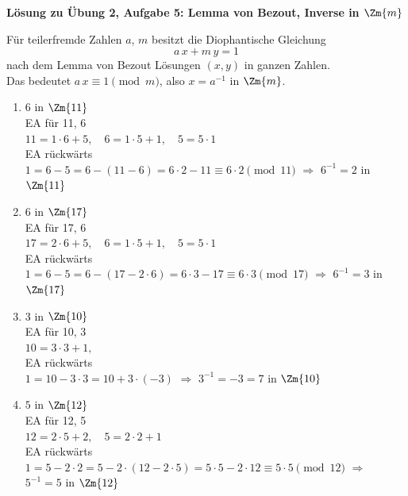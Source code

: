 \textbf{Lösung zu Übung 2, Aufgabe 5: Lemma von Bezout, Inverse in $\Zm{m}$}

\begin{loesung}
Für teilerfremde Zahlen $a$, $m$ besitzt die Diophantische Gleichung
\[
a\,x + m\,y = 1
\]
nach dem Lemma von Bezout Lösungen $(x, y)$ in ganzen Zahlen.\\
Das bedeutet \quad $a\,x \equiv 1 \pmod{m}$, also $x = a^{-1}$ in $\Zm{m}$.

\begin{enumerate}[label=\alph*)]
\item $6$ in $\Zm{11}$\\
EA für 11, 6\\
$11 = 1\cdot 6 + 5,\quad 6 = 1\cdot 5 + 1,\quad 5 = 5\cdot 1$\\
EA rückwärts\\
$1 = 6 - 5 = 6 - (11 - 6) = 6\cdot 2 - 11 \equiv 6\cdot 2 \pmod{11}$ \quad $\Rightarrow$ \quad $6^{-1} = 2$ in $\Zm{11}$

\item $6$ in $\Zm{17}$\\
EA für 17, 6\\
$17 = 2\cdot 6 + 5,\quad 6 = 1\cdot 5 + 1,\quad 5 = 5\cdot 1$\\
EA rückwärts\\
$1 = 6 - 5 = 6 - (17 - 2\cdot 6) = 6\cdot 3 - 17 \equiv 6\cdot 3 \pmod{17}$ \quad $\Rightarrow$ \quad $6^{-1} = 3$ in $\Zm{17}$

\item $3$ in $\Zm{10}$\\
EA für 10, 3\\
$10 = 3\cdot 3 + 1,$\\
EA rückwärts\\
$1 = 10 - 3\cdot 3 = 10 + 3\cdot(-3)$ \quad $\Rightarrow$ \quad $3^{-1} = -3 = 7$ in $\Zm{10}$

\item $5$ in $\Zm{12}$\\
EA für 12, 5\\
$12 = 2\cdot 5 + 2,\quad 5 = 2\cdot 2 + 1$\\
EA rückwärts\\
$1 = 5 - 2\cdot 2 = 5 - 2\cdot(12 - 2\cdot 5) = 5\cdot 5 - 2\cdot 12 \equiv 5\cdot 5 \pmod{12}$ \quad $\Rightarrow$ \quad $5^{-1} = 5$ in $\Zm{12}$
\end{enumerate}
\end{loesung}
